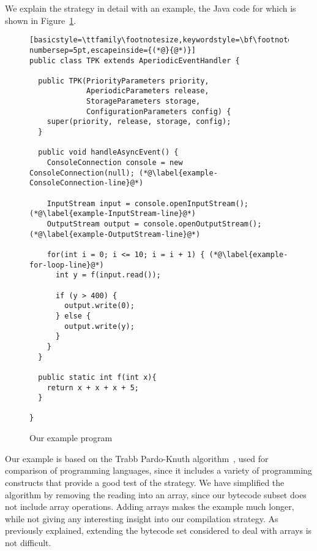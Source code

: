 We explain the strategy in detail with an example, the Java code for
which is shown in Figure~\ref{example-code-figure}.
\begin{figure}[tp]
  \begin{center}
  \begin{minipage}{14cm}
  \begin{lstlisting}[basicstyle=\ttfamily\footnotesize,keywordstyle=\bf\footnotesize,language=Java,numbers=left,numberstyle=\tiny,stepnumber=1, numbersep=5pt,escapeinside={(*@}{@*)}]
public class TPK extends AperiodicEventHandler {

  public TPK(PriorityParameters priority,
             AperiodicParameters release,
             StorageParameters storage,
             ConfigurationParameters config) {
    super(priority, release, storage, config);
  }
      
  public void handleAsyncEvent() {
    ConsoleConnection console = new ConsoleConnection(null); (*@\label{example-ConsoleConnection-line}@*)
        
    InputStream input = console.openInputStream(); (*@\label{example-InputStream-line}@*)
    OutputStream output = console.openOutputStream(); (*@\label{example-OutputStream-line}@*)
        
    for(int i = 0; i <= 10; i = i + 1) { (*@\label{example-for-loop-line}@*)
      int y = f(input.read());
          
      if (y > 400) {
        output.write(0);
      } else {
        output.write(y);
      }
    }
  }
      
  public static int f(int x){
    return x + x + x + 5;
  }
      
}
\end{lstlisting}
\end{minipage}
\end{center}
  \caption{Our example program}
  \label{example-code-figure}
\end{figure}
Our example is based on the Trabb Pardo-Knuth
algorithm~\cite{knuth1980}, used for comparison of programming
languages, since it includes a variety of programming constructs that
provide a good test of the strategy.
We have simplified the algorithm by removing the reading into an
array, since our bytecode subset does not include array operations.
Adding arrays makes the example much longer, while not giving any
interesting insight into our compilation strategy.
As previously explained, extending the bytecode set considered to deal
with arrays is not difficult.

